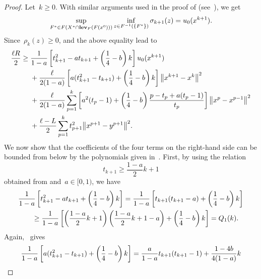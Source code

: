 \documentclass[../main]{subfiles}
\begin{document}
\begin{proof}    
    Let~$k \ge 0$.
    With similar arguments used in the proof of  (see~\cite[Theorem 5.2]{Tanabe2022a}), we get
    \begin{equation}
        \sup_{F^\ast \in F(X^\ast \cap \level_F(F(x^0)))} \inf_{z \in F^{-1}(\set*{F^\ast})} \sigma_{k + 1}(z) = u_0(x^{k + 1})
    .\end{equation} 
    Since~$\rho_k(z) \ge 0$,  and the above equality lead to
    \begin{align}
        \frac{\ell R}{2} \ge{}& \frac{1}{1 - a} \left[ t_{k + 1}^2 - a t_{k + 1} + \left( \frac{1}{4} - b \right) k \right] u_0(x^{k + 1}) \\
        &+ \frac{\ell}{2 (1 - a)} \left[ a (t_{k + 1}^2 - t_{k + 1}) + \left( \frac{1}{4} - b \right) k \right] \norm*{x^{k + 1} - x^k}^2 \\
        &+ \frac{\ell}{2 (1 - a)} \sum_{p = 1}^{k} \left[ a^2 (t_p - 1) + \left( \frac{1}{4} - b \right) \frac{p - t_p + a(t_p - 1)}{t_p} \right] \norm*{x^p - x^{p - 1}}^2 \\
        &+ \frac{\ell - L}{2} \sum_{p = 1}^{k} t_{p + 1}^2 \norm*{x^{p + 1} - y^{p + 1}}^2
    .\end{align}
    We now show that the coefficients of the four terms on the right-hand side can be bounded from below by the polynomials given in~.
    First, by using the relation
    \begin{equation} \label{eq:t k+1 geq}
        t_{k + 1} \ge \frac{1 - a}{2} k + 1
    \end{equation} 
    obtained from  and~$a \in [0, 1)$, we have
    \begin{align}
        \MoveEqLeft \frac{1}{1 - a} \left[ t_{k + 1}^2 - a t_{k + 1} + \left( \frac{1}{4} - b \right) k \right] = \frac{1}{1 - a} \left[ t_{k + 1} (t_{k + 1} - a) + \left( \frac{1}{4} - b \right) k \right] \\
        &\ge \frac{1}{1 - a} \left[ \left( \frac{1 - a}{2} k + 1 \right) \left( \frac{1 - a}{2} k + 1 - a \right) + \left( \frac{1}{4} - b \right) k \right] = Q_1(k)
    .\end{align}
    Again,~ gives
    \begin{align}
        \MoveEqLeft \frac{1}{1 - a} \left[ a (t_{k + 1}^2 - t_{k + 1}) + \left( \frac{1}{4} - b \right) k \right] 
        = \frac{a}{1 - a} t_{k + 1} (t_{k + 1} - 1) + \frac{1 - 4 b}{4 (1 - a)} k \\

\end{align}
\end{proof}
\end{document}
